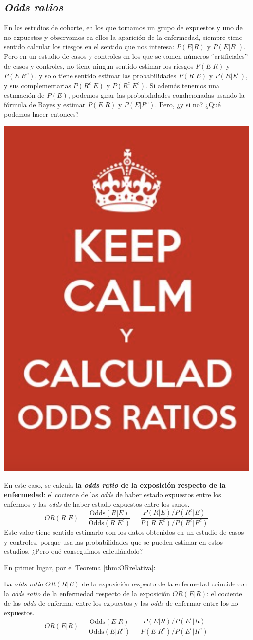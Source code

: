 \documentclass[
]{book}
\theoremstyle{definition}
\theoremstyle{definition}
\theoremstyle{definition}
\theoremstyle{definition}
\theoremstyle{remark}
\begin{document}
\hypertarget{sec:riesgosCyC}{%
\subsection{\texorpdfstring{\emph{Odds ratios}}{Odds ratios}}\label{sec:riesgosCyC}}

En los estudios de cohorte, en los que tomamos un grupo de expuestos y uno de no expuestos y observamos en ellos la aparición de la enfermedad, siempre tiene sentido calcular los riesgos en el sentido que nos interesa: \(P(E|R)\) y \(P(E|R^c)\). Pero en un estudio de casos y controles en los que se tomen números ``artificiales'' de casos y controles, no tiene ningún sentido estimar los riesgos \(P(E|R)\) y \(P(E|R^c)\), y solo tiene sentido estimar las probabilidades \(P(R|E)\) y \(P(R|E^c)\), y sus complementarias \(P(R^c|E)\) y \(P(R^c|E^c)\). Si además tenemos una estimación de \(P(E)\), podemos girar las probabilidades condicionadas usando la fórmula de Bayes y estimar \(P(E|R)\) y \(P(E|R^c)\). Pero, ¿y si no? ¿Qué podemos hacer entonces?

\begin{center}\includegraphics[width=0.3\linewidth]{INREMDN_files/figure-html/keepcalmOR} \end{center}

En este caso, se calcula \textbf{la \emph{odds ratio} de la exposición respecto de la enfermedad}: el cociente de las \emph{odds} de haber estado expuestos entre los enfermos y las \emph{odds} de haber estado expuestos entre los sanos.
\[
OR(R|E)=\frac{\mathrm{Odds}(R|E)}{\mathrm{Odds}(R|E^c)}=\dfrac{P(R|E)/P(R^c|E)}{P(R|E^c)/P(R^c|E^c)}
\]
Este valor tiene sentido estimarlo con los datos obtenidos en un estudio de casos y controles, porque usa las probabilidades que se pueden estimar en estos estudios. ¿Pero qué conseguimos calculándolo?

En primer lugar, por el Teorema \ref{thm:ORrelativa}:

\begin{rmdimportant}
La \emph{odds ratio} \(OR(R|E)\) de la exposición respecto de la enfermedad coincide con la \emph{odds ratio} de la enfermedad respecto de la exposición \(OR(E|R)\): el cociente de las \emph{odds} de enfermar entre los expuestos y las \emph{odds} de enfermar entre los no expuestos.
\[
OR(E|R)=\frac{\mathrm{Odds}(E|R)}{\mathrm{Odds}(E|R^c)}=\frac{P(E|R)/P(E^c|R)}{P(E|R^c)/P(E^c|R^c)}
\]
\end{rmdimportant}
\end{document}
